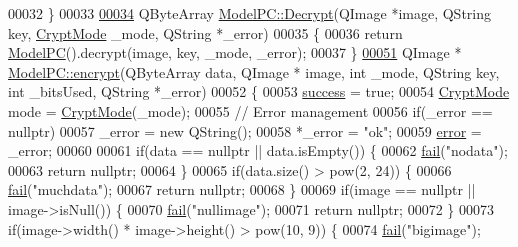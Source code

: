 \begin{DoxyCode}
00032 \}
00033 
\hypertarget{modelpc_8cpp_source.tex_l00034}{}\hyperlink{class_model_p_c_afbca3c9c9b7d92f3a5cc81510ef06cc3}{00034} QByteArray \hyperlink{class_model_p_c_afbca3c9c9b7d92f3a5cc81510ef06cc3}{ModelPC::Decrypt}(QImage *image, QString key, 
      \hyperlink{class_model_p_c_a296dd7afe3e1c49b3da25fd644fe4ceb}{CryptMode} \_mode, QString *\_error)
00035 \{
00036     \textcolor{keywordflow}{return} \hyperlink{class_model_p_c_ae12ebe65ec973c02a0de4850a7c1e31c}{ModelPC}().decrypt(image, key, \_mode, \_error);
00037 \}
\hypertarget{modelpc_8cpp_source.tex_l00051}{}\hyperlink{class_model_p_c_a6f191f62d4635d0d3555fcc0be298794}{00051} QImage * \hyperlink{class_model_p_c_a6f191f62d4635d0d3555fcc0be298794}{ModelPC::encrypt}(QByteArray data, QImage * image, \textcolor{keywordtype}{int} \_mode, QString key, \textcolor{keywordtype}{int} 
      \_bitsUsed, QString *\_error)
00052 \{
00053     \hyperlink{class_model_p_c_a945ffbbc44a832b953c191debd448f4c}{success} = \textcolor{keyword}{true};
00054     \hyperlink{class_model_p_c_a296dd7afe3e1c49b3da25fd644fe4ceb}{CryptMode} mode = \hyperlink{class_model_p_c_a296dd7afe3e1c49b3da25fd644fe4ceb}{CryptMode}(\_mode);
00055     \textcolor{comment}{// Error management}
00056     \textcolor{keywordflow}{if}(\_error == \textcolor{keyword}{nullptr})
00057         \_error = \textcolor{keyword}{new} QString();
00058     *\_error = \textcolor{stringliteral}{"ok"};
00059     \hyperlink{class_model_p_c_a4e5a9c0ca1f06fe5bc478b6bf248c37c}{error} = \_error;
00060 
00061     \textcolor{keywordflow}{if}(data == \textcolor{keyword}{nullptr} || data.isEmpty()) \{
00062         \hyperlink{class_model_p_c_a47464b59b7e37fcee25e55475708aabd}{fail}(\textcolor{stringliteral}{"nodata"});
00063         \textcolor{keywordflow}{return} \textcolor{keyword}{nullptr};
00064     \}
00065     \textcolor{keywordflow}{if}(data.size() > pow(2, 24)) \{
00066         \hyperlink{class_model_p_c_a47464b59b7e37fcee25e55475708aabd}{fail}(\textcolor{stringliteral}{"muchdata"});
00067         \textcolor{keywordflow}{return} \textcolor{keyword}{nullptr};
00068     \}
00069     \textcolor{keywordflow}{if}(image == \textcolor{keyword}{nullptr} || image->isNull()) \{
00070         \hyperlink{class_model_p_c_a47464b59b7e37fcee25e55475708aabd}{fail}(\textcolor{stringliteral}{"nullimage"});
00071         \textcolor{keywordflow}{return} \textcolor{keyword}{nullptr};
00072     \}
00073     \textcolor{keywordflow}{if}(image->width() * image->height() > pow(10, 9)) \{
00074         \hyperlink{class_model_p_c_a47464b59b7e37fcee25e55475708aabd}{fail}(\textcolor{stringliteral}{"bigimage"});

\end{DoxyCode}
